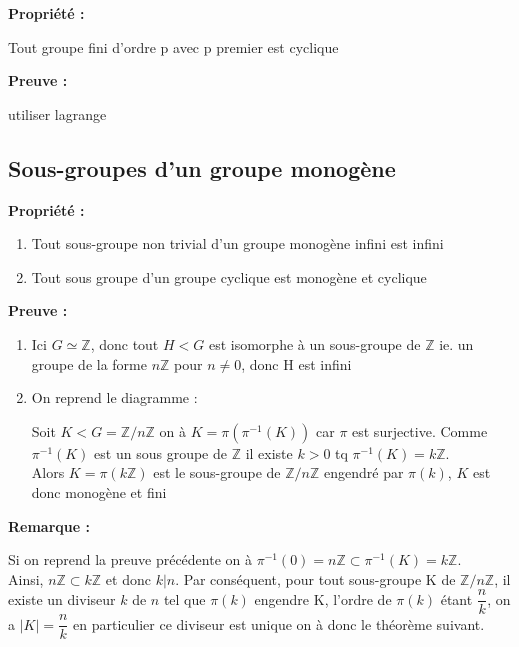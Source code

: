 \documentclass{report}
\newenvironment{preuve}{\begin{tcolorbox}[colframe= white]
    \textbf{Preuve :}
\par }
    {\end{tcolorbox}}
\newenvironment{prop}{\begin{tcolorbox}[colframe= white]
    \textbf{Propriété :}
     \par}
    {\end{tcolorbox}}
\newcommand{\remarque}{
    \noindent\textbf{Remarque :} \par
}
\newcommand{\Z}{\mathbb{Z}}
\newcommand{\znz}{\Z/n\Z}
\begin{document}
\begin{prop}
Tout groupe fini d'ordre p avec p premier est cyclique
\end{prop}

\begin{preuve}
utiliser lagrange
\end{preuve}


\subsection{Sous-groupes d'un groupe monogène}

\begin{prop}
\begin{enumerate}
\item Tout sous-groupe non trivial d'un groupe monogène infini est infini
\item Tout sous groupe d'un groupe cyclique est monogène et cyclique
\end{enumerate}
\end{prop}

\begin{preuve}
\begin{enumerate}
\item Ici $G\simeq \Z$, donc tout $H<G$ est isomorphe à un sous-groupe de $\Z$ ie. un groupe de la forme $n\Z$ pour $n \neq 0$, donc H est infini
\item On reprend le diagramme :

\begin{center}
\end{center}

Soit $ K < G= \Z/n\Z$ on à $K=\pi(\pi^{-1}(K))$ car $\pi$ est surjective. Comme $\pi^{-1}(K)$ est un sous groupe de $\Z$ il existe $k>0$ tq $\pi^{-1}(K)=k\Z$.\\
Alors $K = \pi(k\Z)$ est le sous-groupe de $\Z/n\Z$ engendré par $\pi(k)$, $K$ est donc monogène et fini

\end{enumerate}
\end{preuve}

\remarque{Si on reprend la preuve précédente on à $\pi^{-1}(0) = n\Z \subset \pi^{-1}(K)= k\Z$.\\ Ainsi, $n\Z \subset k\Z$ et donc $k|n$. Par conséquent, pour tout sous-groupe K de $\znz$, il existe un diviseur $k$ de $n$ tel que $\pi(k)$ engendre K, l'ordre de $\pi(k)$ étant $\dfrac{n}{k}$, on a $|K|=\dfrac{n}{k}$ en particulier ce diviseur est unique on à donc le théorème suivant.}
\end{document}
